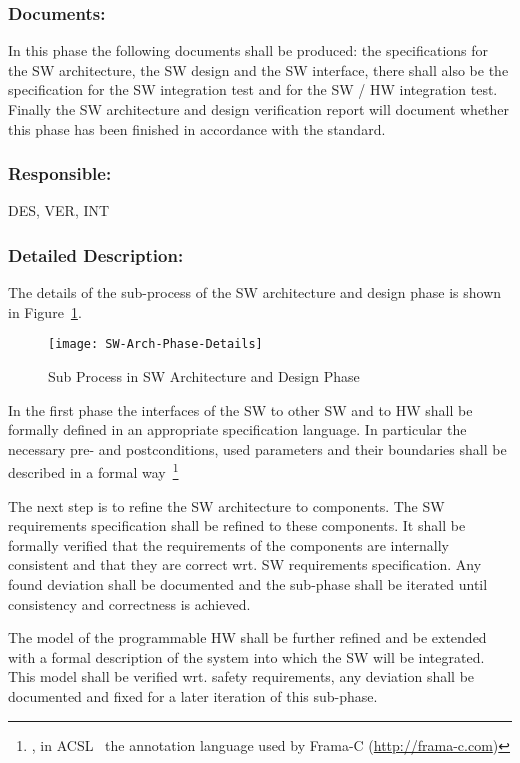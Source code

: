 \subsubsection{Documents:}
\label{sec:sw-arch-documents}
In this phase the following documents shall be produced: the
specifications for the SW architecture, the SW design and the SW interface,
there shall also be the specification for the SW integration test and for the SW
/ HW integration test. Finally the SW architecture and design verification
report will document whether this phase has been finished in accordance with
the standard.

\subsubsection{Responsible:}
\label{sec:sw-arch-responsible}
DES, VER, INT

\subsubsection{Detailed Description:}
\label{sec:sw-arch-deta-descr}
The details of the sub-process of the SW architecture and design phase is shown
in Figure~\ref{fig:detailed-sw-arch-phase}.

\begin{figure}[ht]
  \centering
  \texttt{[image: SW-Arch-Phase-Details]}
  \caption{Sub Process in SW Architecture and Design Phase}
  \label{fig:detailed-sw-arch-phase}
\end{figure}

In the first phase the interfaces of the SW to other SW and to HW shall be
formally defined in an appropriate specification language. In particular the
necessary pre- and postconditions, used parameters and their boundaries shall be
described in a formal way~\footnote{\eg, in ACSL~\cite{baudin09acsl} the
  annotation language used by Frama-C (\url{http://frama-c.com})}

The next step is to refine the SW architecture to components. The SW
requirements specification shall be refined to these components. It shall be
formally verified that the requirements of the components are internally
consistent and that they are correct wrt. SW requirements specification. Any
found deviation shall be documented and the sub-phase shall be iterated until
consistency and correctness is achieved.

The model of the programmable HW shall be further refined and be extended with a
formal description of the system into which the SW will be integrated. This
model shall be verified wrt. safety requirements, any deviation shall be
documented and fixed for a later iteration of this sub-phase.

